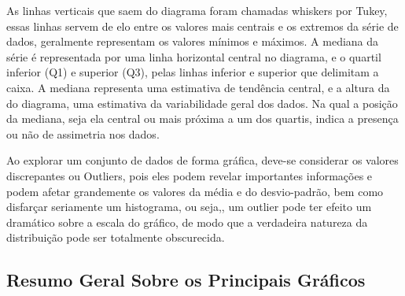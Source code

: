 \begin{figure}[!htb]
\end{figure}

\newpage

\inic As linhas verticais que saem do diagrama foram chamadas whiskers
por Tukey, essas linhas servem de elo entre os valores mais
centrais e os extremos da série de dados, geralmente representam
os valores mínimos e máximos. A mediana da série é representada
por uma linha horizontal central no diagrama, e o quartil inferior
(Q1) e superior (Q3), pelas linhas inferior e superior que
delimitam a caixa. A mediana representa uma estimativa de tendência central, e a altura da do diagrama, uma estimativa da variabilidade geral dos
dados. Na qual a posição da mediana, seja ela central ou mais
próxima a um dos quartis, indica a presença ou não de assimetria
nos dados.\vskip0.3cm

\inic Ao explorar um conjunto de dados de forma gráfica, deve-se considerar os valores discrepantes ou Outliers, pois eles podem revelar importantes informações e podem afetar grandemente os valores da média e do desvio-padrão, bem como disfarçar seriamente um histograma, ou seja,, um outlier pode ter efeito um dramático sobre a escala do gráfico, de modo que a verdadeira natureza da distribuição pode ser totalmente  obscurecida.


\newpage


\subsection{Resumo Geral Sobre os Principais Gráficos}


